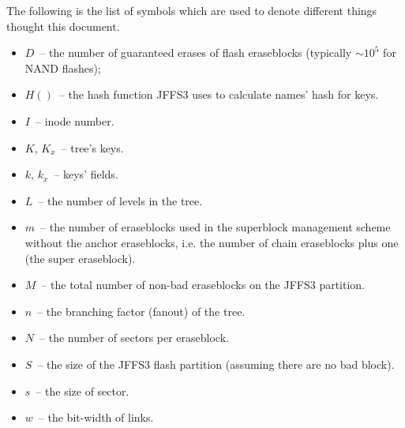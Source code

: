 \documentclass[12pt,a4paper,oneside,titlepage]{article}
\begin{document}
The following is the list of symbols which are used to denote different things
thought this document.

\begin{itemize}

\item $D$~-- the number of guaranteed erases of flash eraseblocks (typically
$\sim 10^5$ for NAND flashes);

\item $H()$~-- the hash function JFFS3 uses to calculate names' hash for keys.

\item $I$~-- inode number.

\item $K$, $K_x$~-- tree's keys.

\item $k$, $k_x$~-- keys' fields.

\item $L$~-- the number of levels in the tree.

\item $m$~-- the number of eraseblocks used in the superblock management
scheme without the anchor eraseblocks, i.e. the number of chain eraseblocks
plus one (the super eraseblock).

\item $M$~-- the total number of non-bad eraseblocks on the JFFS3 partition.

\item $n$~-- the branching factor (fanout) of the tree.

\item $N$~-- the number of sectors per eraseblock.

\item $S$~-- the size of the JFFS3 flash partition (assuming there are no bad
block).

\item $s$~-- the size of sector.

\item $w$~-- the \mbox{bit-width} of links.

\end{itemize}

%
%
\end{document}
